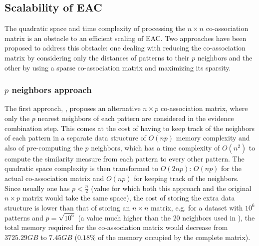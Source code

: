 


\subsection{Scalability of EAC} 
The quadratic space and time complexity of processing the $n \times n$ co-association matrix is an obstacle to an efficient scaling of EAC.
Two approaches have been proposed to address this obstacle: one dealing with reducing the co-association matrix by considering only the distances of patterns to their $p$ neighbors and the other by using a sparse co-association matrix and maximizing its sparsity.

\subsubsection{$p$ neighbors approach}
The first approach, \cite{Fred2005}, proposes an alternative $n \times p$ co-association matrix, where only the $p$ nearest neighbors of each pattern are considered in the evidence combination step.
This comes at the cost of having to keep track of the neighbors of each pattern in a separate data structure of $O(np)$ memory complexity and also of pre-computing the $p$ neighbors, which has a time complexity of $O(n^2)$ to compute the similarity measure from each pattern to every other pattern.
The quadratic space complexity is then transformed to $O(2np)$: $O(np)$ for the actual co-association matrix and $O(np)$ for keeping track of the neighbors.
Since usually one has $p < \frac{n}{2}$ (value for which both this approach and the original $n \times p$ matrix would take the same space), the cost of storing the extra data structure is lower than that of storing an $n \times n$ matrix, e.g. for a dataset with $10^6$ patterns and $p=\sqrt{10^6}$ (a value much higher than the $20$ neighbors used in \cite{Fred2005}), the total memory required for the co-association matrix would decrease from $3725.29 GB$ to $7.45 GB$ ($0.18\%$ of the memory occupied by the complete matrix).

